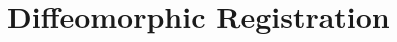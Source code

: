 \documentclass[11pt]{article}
\begin{document}
\section{Diffeomorphic Registration}




\newpage
\printbibliography 
\end{document}
